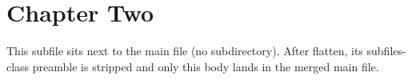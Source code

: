 \documentclass[main]{subfiles}
\begin{document}
\section{Chapter Two}
This subfile sits next to the main file (no subdirectory). After flatten,
its subfiles-class preamble is stripped and only this body lands in the
merged main file.
\end{document}
